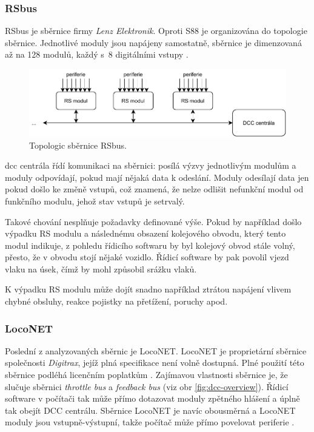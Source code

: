 \subsubsection{RSbus}

RSbus je sběrnice firmy \textit{Lenz Elektronik}. Oproti S88 je organizována
do topologie sběrnice. Jednotlivé moduly jsou napájeny samostatně, sběrnice je
dimenzovaná až na 128 modulů, každý s~8 digitálními vstupy \cite{rs:web}
\cite{rs_lib:web}.

\begin{figure}[ht!]
\includegraphics[width=\textwidth]{data/rs.pdf}
\caption{Topologic sběrnice RSbus.}
\label{fig:rs-topology}
\end{figure}

\gls{dcc} centrála řídí komunikaci na sběrnici: posílá výzvy jednotlivým
modulům a moduly odpovídají, pokud mají nějaká data k odeslání. Moduly odesílají
data jen pokud došlo ke změně vstupů, což znamená, že nelze odlišit nefunkční
modul od funkčního modulu, jehož stav vstupů je setrvalý.

Takové chování nesplňuje požadavky definované výše. Pokud by například došlo
výpadku RS modulu a následnému obsazení kolejového obvodu, který tento modul
indikuje, z pohledu řídicího softwaru by byl kolejový obvod stále volný, přesto,
že v obvodu stojí nějaké vozidlo. Řídicí software by pak povolil vjezd vlaku na
úsek, čímž by mohl způsobil srážku vlaků.

K výpadku RS modulu může dojít snadno například ztrátou napájení vlivem chybné
obsluhy, reakce pojistky na přetížení, poruchy apod.

\subsubsection{LocoNET}

Poslední z analyzovaných sběrnic je LocoNET. LocoNET je proprietární sběrnice
společnosti \textit{Digitrax}, jejíž plná specifikace není volně dostupná.
Plné použití této sběrnice podléhá licenčním poplatkům \cite{loconet_license:web}.
Zajímavou vlastnosti sběrnice je, že slučuje sběrnici \textit{throttle bus}
a \textit{feedback bus} (viz obr \ref{fig:dcc-overview}). Řídicí software
v počítači tak může přímo dotazovat moduly zpětného hlášení a úplně tak obejít
DCC centrálu. Sběrnice LocoNET je navíc obousměrná a LocoNET moduly jsou
vstupně-výstupní, takže počítač může přímo povelovat periferie
\cite{loconet:web}.

